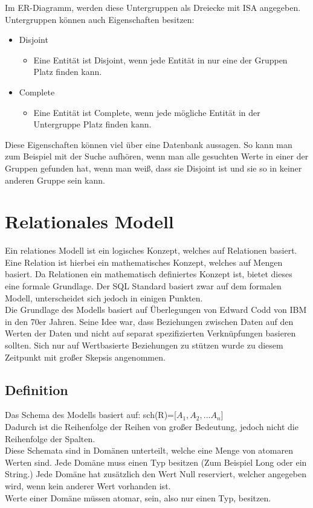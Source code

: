 \documentclass{article}
\begin{document}
	Im ER-Diagramm, werden diese Untergruppen als Dreiecke mit ISA angegeben. \\
	Untergruppen können auch Eigenschaften besitzen:
	\begin{itemize}
		\item{Disjoint}
		\begin{itemize}
			\item{Eine Entität ist Disjoint, wenn jede Entität in nur eine der Gruppen Platz finden kann.}
		\end{itemize}
		\item{Complete}
		\begin{itemize}
			\item{Eine Entität ist Complete, wenn jede mögliche Entität in der Untergruppe Platz finden kann.}
		\end{itemize}
	\end{itemize}
	Diese Eigenschaften können viel über eine Datenbank aussagen. So kann man zum Beispiel mit der Suche aufhören, wenn man alle gesuchten Werte in einer der Gruppen gefunden hat, wenn man weiß, dass sie Disjoint ist und sie so in keiner anderen Gruppe sein kann.
	\section{Relationales Modell}
	Ein relationes Modell ist ein logisches Konzept, welches auf Relationen basiert. Eine Relation ist hierbei ein mathematisches Konzept, welches auf Mengen basiert. Da Relationen ein mathematisch definiertes Konzept ist, bietet dieses eine formale Grundlage. Der SQL Standard basiert zwar auf dem formalen Modell, unterscheidet sich jedoch in einigen Punkten. \\
	Die Grundlage des Modells basiert auf Überlegungen von Edward Codd von IBM in den 70er Jahren. Seine Idee war, dass Beziehungen zwischen Daten auf den Werten der Daten und nicht auf separat spezifizierten Verknüpfungen basieren sollten. Sich nur auf Wertbasierte Beziehungen zu stützen wurde zu diesem Zeitpunkt mit großer Skepsis angenommen.
	\subsection{Definition}
	Das Schema des Modells basiert auf: sch(R)=[$A_1, A_2,...A_n$]\\
	Dadurch ist die Reihenfolge der Reihen von großer Bedeutung, jedoch nicht die Reihenfolge der Spalten. \\
	Diese Schemata sind in Domänen unterteilt, welche eine Menge von atomaren Werten sind. Jede Domäne muss einen Typ besitzen (Zum Beispiel Long oder ein String.) Jede Domäne hat zusätzlich den Wert Null reserviert, welcher angegeben wird, wenn kein anderer Wert vorhanden ist. \\
	Werte einer Domäne müssen atomar, sein, also nur einen Typ, besitzen. 
\end{document}

